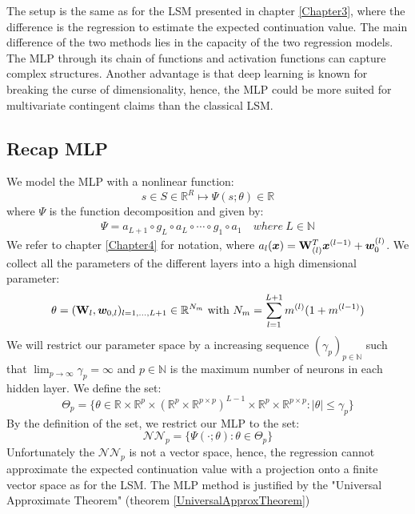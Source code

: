 The setup is the same as for the LSM presented in chapter \ref{Chapter3}, where the difference is the regression to estimate the expected continuation value. The main difference of the two methods lies in the capacity of the two regression models. The MLP through its chain of functions and activation functions can capture complex structures. Another advantage is that deep learning is known for breaking the curse of dimensionality, hence, the MLP could be more suited for multivariate contingent claims than the classical LSM.

\subsection{Recap MLP}
We model the MLP with a nonlinear function:
$$s \in S \in \mathbb{R}^R \mapsto \Psi(s;\theta) \in \mathbb{R}$$
where $\Psi$ is the function decomposition and given by:
\begin{align*}
\Psi = a_{L+1} \circ g_L \circ a_{L} \circ \cdots \circ g_1 \circ a_1 \quad where \ L\in \mathbb{N}
\end{align*}
We refer to chapter \ref{Chapter4} for notation, where $a_l(\bm{x})=\mathbf{W}_{(l)}^T \bm{x}^{(l-1)} + \bm{w}_{0}^{(l)}$. We collect all the parameters of the different layers into a high dimensional parameter:
$$\theta=(\mathbf{W}_l, \bm{w}_{0,l})_{l=1,\ldots,L+1} \in \mathbb{R}^{N_m} \text{ with } N_m=\sum_{l=1}^{L+1} m^{(l)} (1+ m^{(l-1)})$$
We will restrict our parameter space by a increasing sequence $(\gamma_p)_{p\in \mathbb{N}}$ such that $\lim_{p\to \infty} \gamma_p=\infty$ and $p\in \mathbb{N}$ is the maximum number of neurons in each hidden layer. We define the set:
$$\Theta_p = \{ \theta \in \mathbb{R} \times \mathbb{R}^p \times (\mathbb{R}^p \times \mathbb{R}^{p \times p})^{L-1} \times \mathbb{R}^{p} \times \mathbb{R}^{p \times p} : |\theta| \leq \gamma_p \}$$
By the definition of the set, we restrict our MLP to the set:
$$\mathcal{N} \mathcal{N}_p= \{ \Psi(\cdot;\theta) : \theta \in \Theta_p \}$$
Unfortunately the $\mathcal{N} \mathcal{N}_p$ is not a vector space, hence, the regression cannot approximate the expected continuation value with a projection onto a finite vector space as for the LSM. The MLP method is justified by the "Universal Approximate Theorem" (theorem \ref{UniversalApproxTheorem})

